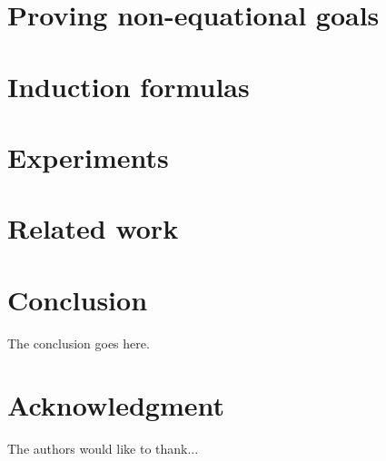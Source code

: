 \documentclass[conference]{IEEEtran}
\theoremstyle{definition}
\begin{document}
	\section{Proving non-equational goals}
	\label{sec:predicates}
	

	\section{Induction formulas}
	\label{sec:induction_formulas}
	

	\section{Experiments}
	\label{sec:experiments}
	

	\section{Related work}
	\label{sec:related_work}
	

	\section{Conclusion}
	The conclusion goes here.






	\section*{Acknowledgment}


	The authors would like to thank...







\end{document}
